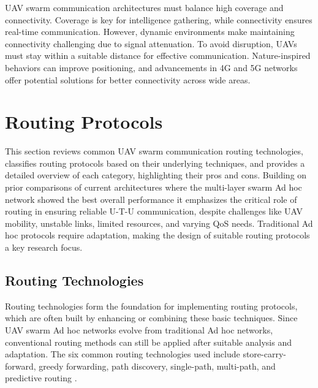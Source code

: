 UAV swarm communication architectures must balance high coverage and connectivity. Coverage is key for intelligence gathering, while connectivity ensures real-time communication. However, dynamic environments make maintaining connectivity challenging due to signal attenuation. To avoid disruption, UAVs must stay within a suitable distance for effective communication. Nature-inspired behaviors can improve positioning, and advancements in 4G and 5G networks offer potential solutions for better connectivity across wide areas.





\section{Routing Protocols}


This section reviews common UAV swarm communication routing technologies, classifies routing protocols based on their underlying techniques, and provides a detailed overview of each category, highlighting their pros and cons. Building on prior comparisons of current architectures where the multi-layer swarm Ad hoc network showed the best overall performance it emphasizes the critical role of routing in ensuring reliable U-T-U communication, despite challenges like UAV mobility, unstable links, limited resources, and varying QoS needs. Traditional Ad hoc protocols require adaptation, making the design of suitable routing protocols a key research focus.



\subsection{Routing Technologies}

Routing technologies form the foundation for implementing routing protocols, which are often built by enhancing or combining these basic techniques. Since UAV swarm Ad hoc networks evolve from traditional Ad hoc networks, conventional routing methods can still be applied after suitable analysis and adaptation. The six common routing technologies used include store-carry-forward, greedy forwarding, path discovery, single-path, multi-path, and predictive routing \cite{Chen2020}.


